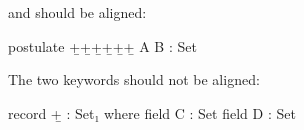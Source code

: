 \documentclass{article}
\begin{document}
 and  should be aligned:
\begin{code}
  postulate
    +̲+̲+̲+̲+̲+̲  A
            B : Set
\end{code}

The two  keywords should not be aligned:
\begin{code}
  record +̲ : Set₁ where  field C : Set
                          field D : Set
\end{code}
\end{document}
